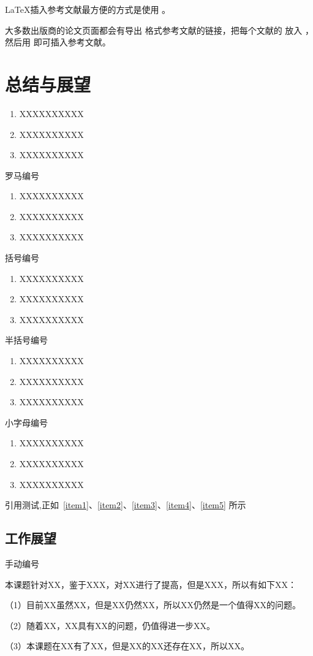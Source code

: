 \LaTeX \cite{lamport1994latex}插入参考文献最方便的方式是使用 \cite{pritchard1969statistical}。

大多数出版商的论文页面都会有导出  格式参考文献的链接，把每个文献的  放入 ，然后用  即可插入参考文献。


\newpage    %


\section{总结与展望}

\begin{enumerate}
 \item XXXXXXXXXX
 \label{item1}
 \item XXXXXXXXXX
 \item XXXXXXXXXX
\end{enumerate}
罗马编号
\begin{enumerate}[label=(\roman*)]
 \item XXXXXXXXXX
 \label{item2}
 \item XXXXXXXXXX
 \item XXXXXXXXXX
\end{enumerate}
括号编号
\begin{enumerate}[label=(\arabic*)]
 \item XXXXXXXXXX
 \label{item3}
 \item XXXXXXXXXX
 \item XXXXXXXXXX
\end{enumerate}
半括号编号
\begin{enumerate}[label=\arabic*)]
 \item XXXXXXXXXX
 \label{item4}
 \item XXXXXXXXXX
 \item XXXXXXXXXX
\end{enumerate}
小字母编号
\begin{enumerate}[label=\alph*)]
 \item XXXXXXXXXX
 \label{item5}
 \item XXXXXXXXXX
 \item XXXXXXXXXX
\end{enumerate}

引用测试,正如~\ref{item1}、\ref{item2}、\ref{item3}、\ref{item4}、\ref{item5} 所示

\subsection{工作展望}
手动编号 %

本课题针对XX，鉴于XXX，对XX进行了提高，但是XXX，所以有如下XX：

（1）目前XX虽然XX，但是XX仍然XX，所以XX仍然是一个值得XX的问题。

（2）随着XX，XX具有XX的问题，仍值得进一步XX。

（3）本课题在XX有了XX，但是XX的XX还存在XX，所以XX。


\newpage
